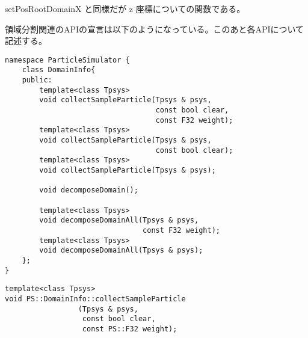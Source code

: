 setPosRootDomainX と同様だが z 座標についての関数である。



領域分割関連のAPIの宣言は以下のようになっている。このあと各APIについて
記述する。
\begin{lstlisting}[caption=DomainInfo2]
namespace ParticleSimulator {
    class DomainInfo{
    public:
        template<class Tpsys>
        void collectSampleParticle(Tpsys & psys,
                                   const bool clear,
                                   const F32 weight);
        template<class Tpsys>
        void collectSampleParticle(Tpsys & psys,
                                   const bool clear);
        template<class Tpsys>
        void collectSampleParticle(Tpsys & psys);
        
        void decomposeDomain();
        
        template<class Tpsys>
        void decomposeDomainAll(Tpsys & psys,
                                const F32 weight);
        template<class Tpsys>
        void decomposeDomainAll(Tpsys & psys);
    };
}
\end{lstlisting}


\begin{screen}
\begin{verbatim}
template<class Tpsys>
void PS::DomainInfo::collectSampleParticle
                 (Tpsys & psys,
                  const bool clear,
                  const PS::F32 weight);
\end{verbatim}
\end{screen}


